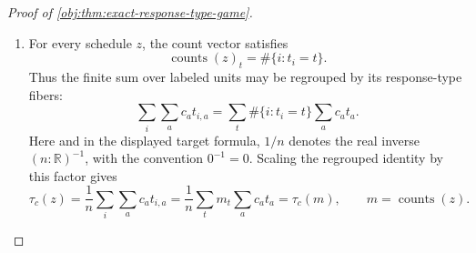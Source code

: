 \documentclass[11pt]{article}
\begin{document}
\begin{proof}[Proof of \cref{obj:thm:exact-response-type-game}]
\begin{enumerate}
The two constructions are inverse to each other.  Under either construction,
\[
\mathcal D(A)=
\frac{\pi_{\operatorname{alloc}(A)}}{
|\mathcal O_{\mathrm{alloc}}(\operatorname{alloc}(A))|},
\qquad
\widehat\tau(A,y)=
\delta(\operatorname{alloc}(A),\operatorname{succ}(A,y)).
\]
It remains to identify the regrouped labeled risk with the orbit risk.  For a labeled schedule \(z\), put \(m_z=\operatorname{counts}(z)\) and define the observed labeled fiber
\[
\mathcal L_z(r,x)=
\{A\in\mathcal A_K^n:
\operatorname{alloc}(A)=r,
\operatorname{succ}(A,Y^{\mathrm{obs}}(z,A))=x\}.
\]
For a table \(h\in\mathcal H(m_z,r,x)\), the number of assignments in \(\mathcal L_z(r,x)\) having \(h_{t,a}\) units of response type \(t\) assigned to arm \(a\) is
\[
\prod_{t\in\mathcal T_K}
\frac{m_{z,t}!}{\prod_{a\in\mathcal A_K}h_{t,a}!}.
\]
Summing over the feasible contingency-table fiber and dividing by the allocation-orbit cardinality
\[
|\mathcal O_{\mathrm{alloc}}(r)|=
\frac{n!}{\prod_{a\in\mathcal A_K}r_a!}
\]
gives
\[
\frac{|\mathcal L_z(r,x)|}{|\mathcal O_{\mathrm{alloc}}(r)|}
=
\frac{\prod_{a\in\mathcal A_K}r_a!}{n!}
\sum_{h\in\mathcal H(m_z,r,x)}
\prod_{t\in\mathcal T_K}
\frac{m_{z,t}!}{\prod_{a\in\mathcal A_K}h_{t,a}!}
=
P_{m_z}(x\mid r),
\]
where the last equality is the likelihood formula in \cref{obj:def:orbit-likelihood}.  The target term is also constant on the response-count orbit,
\[
\tau_c(z)=
\frac1n\sum_i\sum_{a\in\mathcal A_K}c_a t_{i,a}
=
\frac1n\sum_{t\in\mathcal T_K}m_{z,t}\sum_{a\in\mathcal A_K}c_a t_a
=\tau_c(m_z).
\]
Therefore, regrouping first by allocation counts and then by observed fibers yields
\[
\begin{aligned}
R_n(p;z)
&=
\sum_r\sum_{A\in\mathcal O_{\mathrm{alloc}}(r)}
\frac{\pi_r}{|\mathcal O_{\mathrm{alloc}}(r)|}
\{\delta(r,\operatorname{succ}(A,Y^{\mathrm{obs}}(z,A)))-\tau_c(m_z)\}^2 \\
&=
\sum_r \pi_r\sum_x
\frac{|\mathcal L_z(r,x)|}{|\mathcal O_{\mathrm{alloc}}(r)|}
\{\delta(r,x)-\tau_c(m_z)\}^2 \\
&=
\sum_r \pi_r
\sum_x P_{m_z}(x\mid r)
\{\delta(r,x)-\tau_c(m_z)\}^2
=
R_n(q;m_z).
\end{aligned}
\]
This proves the stated bijection and the exact equality of allocation-count, observation-count, and risk rules. %

\item For every schedule \(z\), the count vector satisfies
\[
\operatorname{counts}(z)_t=\#\{i:t_i=t\}.
\]
Thus the finite sum over labeled units may be regrouped by its response-type fibers:
\[
\sum_i\sum_a c_a t_{i,a}
=
\sum_t
\#\{i:t_i=t\}\sum_a c_a t_a.
\]
Here and in the displayed target formula, \(1/n\) denotes the real inverse \((n:\mathbb R)^{-1}\), with the convention \(0^{-1}=0\).  Scaling the regrouped identity by this factor gives
\[
\tau_c(z)
=
\frac{1}{n}\sum_i\sum_a c_a t_{i,a}
=
\frac{1}{n}\sum_t m_t\sum_a c_a t_a
=
\tau_c(m),
\qquad m=\operatorname{counts}(z).
\] %


\end{enumerate}
\end{proof}
\end{document}
